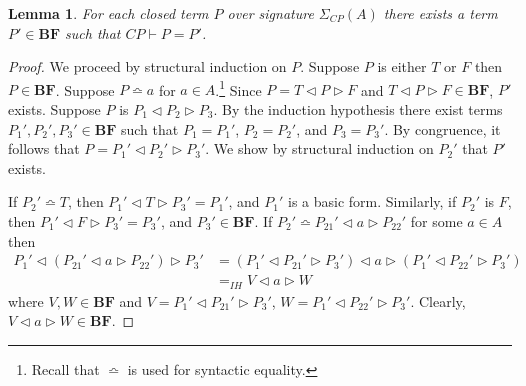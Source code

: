 \documentclass[a4paper,twoside,openright]{report}
\newcommand{\sig}{\ensuremath{\Sigma_{CP}(A)}}
\newcommand{\BF}{\ensuremath{\textbf{BF}}}
\newcommand{\syn}{\bumpeq}
\newcommand{\lef}{\ensuremath{\triangleleft}}
\newcommand{\rig}{\ensuremath{\triangleright}}
\newtheorem{lem}[theorem]{Lemma}
\begin{document}
\begin{lem}\label{basic form theorem}
For each closed term $P$ over signature $\sig$ there exists a
term $P'\in\BF$ such that $CP\vdash P=P'$.
\end{lem}
\begin{proof}
We proceed by structural induction on $P$. Suppose $P$ is either $T$ or $F$ then $P\in\BF$. Suppose $P\syn a$ for $a\in A$.\footnote{Recall that $\syn$ is used for syntactic equality.} Since $P=T\lef P\rig F$ and $T\lef P\rig F\in\BF$, $P'$ exists. Suppose $P$ is $P_1\lef P_2\rig P_3$. By the induction hypothesis there exist terms $P_1',P_2',P_3'\in\BF$ such that $P_1=P_1'$, $P_2=P_2'$, and $P_3=P_3'$. By congruence, it follows that $P=P_1'\lef P_2'\rig P_3'$. We show by structural induction on $P_2'$ that $P'$ exists.

If $P_2'\syn T$, then $P_1'\lef T\rig P_3'=P_1'$, and $P_1'$ is a basic form. Similarly, if $P_2'$ is $F$, then $P_1'\lef F\rig P_3'=P_3'$, and $P_3'\in\BF$. If $P_2'\syn P_{21}'\lef a\rig P_{22}'$ for some $a\in A$ then
\begin{align*}
P_1'\lef (P_{21}'\lef a\rig P_{22}')\rig P_3' &=
(P_1'\lef P_{21}'\rig P_3')\lef a\rig (P_1'\lef P_{22}'\rig P_3')\\
&=_{IH} V\lef a\rig W
\end{align*}
where $V,W\in\BF$ and $V=P_1'\lef P_{21}'\rig P_3'$, $W=P_1'\lef P_{22}'\rig P_3'$. Clearly, $V\lef a\rig W\in\BF$.
\end{proof}
\end{document}
